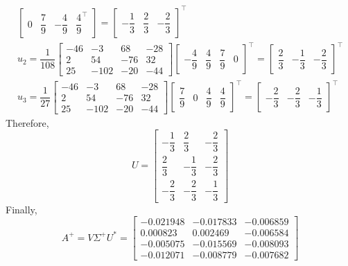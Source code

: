 \documentclass[12pt]{report}
\begin{document}
\begin{solution}
\[\begin{array}{c}
\begin{bmatrix}
               0 & \dfrac{7}{9} & -\dfrac{4}{9} & \dfrac{4}{9}^\intercal 
            \end{bmatrix} = \begin{bmatrix}
                  -\dfrac{1}{3} & \dfrac{2}{3} & -\dfrac{2}{3}
               \end{bmatrix}^\intercal \\[1.5cm]
               u_2 = \dfrac{1}{108} \begin{bmatrix}
                  -46 & -3 & 68 & -28\\
                  2 & 54 & -76 & 32 \\
                  25 & -102 & -20 & -44 
               \end{bmatrix} \begin{bmatrix}
                  -\dfrac{4}{9} & \dfrac{4}{9} & \dfrac{7}{9} & 0
               \end{bmatrix}^\intercal = \begin{bmatrix}
                  \dfrac{2}{3} & -\dfrac{1}{3} & -\dfrac{2}{3}
               \end{bmatrix}^\intercal \\[1.5cm]
               u_3 = \dfrac{1}{27} \begin{bmatrix}
                  -46 & -3 & 68 & -28\\
                  2 & 54 & -76 & 32 \\
                  25 & -102 & -20 & -44 
               \end{bmatrix} \begin{bmatrix}
                  \dfrac{7}{9} & 0 & \dfrac{4}{9} & \dfrac{4}{9}
               \end{bmatrix}^\intercal = \begin{bmatrix}
                  -\dfrac{2}{3} & -\dfrac{2}{3} & -\dfrac{1}{3}
               \end{bmatrix}^\intercal
         \end{array}
    \]
    Therefore, 
    \[
         U = \begin{bmatrix}
            -\dfrac{1}{3} & \dfrac{2}{3} & -\dfrac{2}{3}\\[0.25cm] 
            \dfrac{2}{3} & -\dfrac{1}{3} & -\dfrac{2}{3}\\[0.25cm]
            -\dfrac{2}{3} & -\dfrac{2}{3} & -\dfrac{1}{3}
         \end{bmatrix}
    \]
    Finally, 
    \[
       A^+ = V\Sigma^+U^* = \begin{bmatrix}
         -0.021948 & -0.017833 & -0.006859\\
          0.000823 &  0.002469 & -0.006584\\
         -0.005075 & -0.015569 & -0.008093\\
         -0.012071 & -0.008779 & -0.007682
        \end{bmatrix}
    \]
\end{solution}
\end{document}
